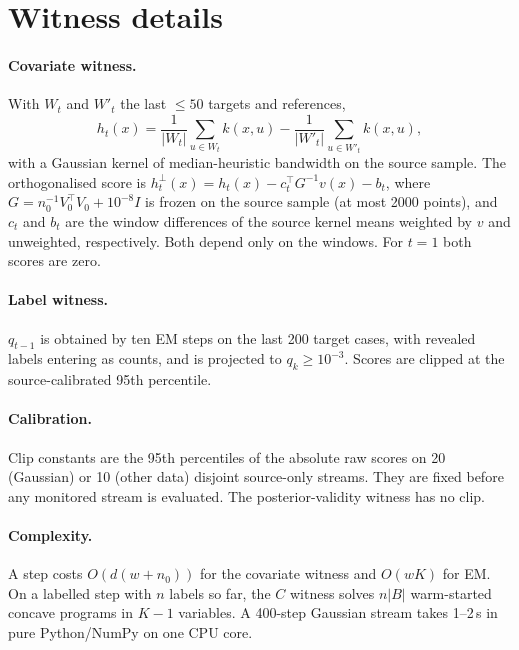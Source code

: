 \section{Witness details}
\label{app:witness}

\paragraph{Covariate witness.} With $W_t$ and $W'_t$ the last $\le50$ targets and references,
\[
h_t(x)=\frac{1}{|W_t|}\sum_{u\in W_t}k(x,u)-\frac{1}{|W'_t|}\sum_{u\in W'_t}k(x,u),
\]
with a Gaussian kernel of median-heuristic bandwidth on the source sample. The orthogonalised score is $h^\perp_t(x)=h_t(x)-c_t^\top G^{-1}v(x)-b_t$, where $G=n_0^{-1}V_0^\top V_0+10^{-8}I$ is frozen on the source sample (at most 2000 points), and $c_t$ and $b_t$ are the window differences of the source kernel means weighted by $v$ and unweighted, respectively. Both depend only on the windows. For $t=1$ both scores are zero.

\paragraph{Label witness.} $q_{t-1}$ is obtained by ten EM steps on the last 200 target cases, with revealed labels entering as counts, and is projected to $q_k\ge10^{-3}$. Scores are clipped at the source-calibrated 95th percentile.

\paragraph{Calibration.} Clip constants are the 95th percentiles of the absolute raw scores on 20 (Gaussian) or 10 (other data) disjoint source-only streams. They are fixed before any monitored stream is evaluated. The posterior-validity witness has no clip.

\paragraph{Complexity.} A step costs $O(d(w+n_0))$ for the covariate witness and $O(wK)$ for EM. On a labelled step with $n$ labels so far, the $C$ witness solves $n|B|$ warm-started concave programs in $K-1$ variables. A 400-step Gaussian stream takes 1--2\,s in pure Python/NumPy on one CPU core.
